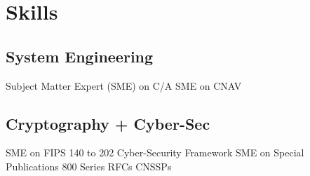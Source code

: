\documentclass{deedy-resume} %
\begin{document}
\begin{minipage}[t]{0.33\textwidth}
\sectionspace %


\section{Skills}

\subsection{System Engineering}

Subject Matter Expert (SME) on C/A \textbullet{} SME on CNAV
\sectionspace %
\subsection{Cryptography + Cyber-Sec}
SME on FIPS 140 to 202\textbullet{} Cyber-Security Framework \textbullet{} SME on Special Publications 800 Series \textbullet{} RFCs \textbullet{} CNSSPs \\

\sectionspace %


\end{minipage} %
\hfill
%
%
\end{document}
